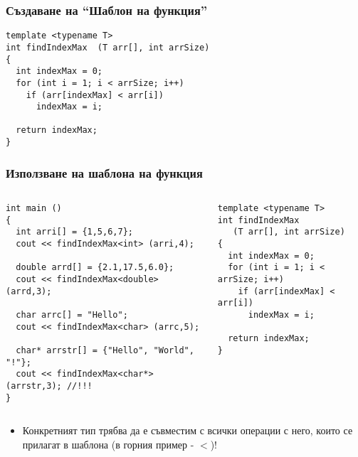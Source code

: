 \documentclass{beamer}
\begin{document}
\begin{frame}[fragile]
\frametitle{Създаване на ``Шаблон на функция''}


\begin{flushleft}
\begin{lstlisting}
template <typename T>
int findIndexMax  (T arr[], int arrSize)
{
  int indexMax = 0;
  for (int i = 1; i < arrSize; i++)
    if (arr[indexMax] < arr[i])
      indexMax = i;

  return indexMax;
}

\end{lstlisting}  
\end{flushleft}

\end{frame}


\begin{frame}[fragile]
\frametitle{Използване на шаблона на функция}

\begin{columns}[t]
  \begin{column}{0.6\textwidth}

\begin{flushleft}
\begin{lstlisting}
int main ()
{
  int arri[] = {1,5,6,7};
  cout << findIndexMax<int> (arri,4);

  double arrd[] = {2.1,17.5,6.0};
  cout << findIndexMax<double> (arrd,3);

  char arrc[] = "Hello";
  cout << findIndexMax<char> (arrc,5);

  char* arrstr[] = {"Hello", "World", "!"};
  cout << findIndexMax<char*> (arrstr,3); //!!!
}
\end{lstlisting}  
\end{flushleft}

  \end{column}
  \begin{column}{0.4\textwidth}

\begin{flushleft}
\begin{lstlisting}
template <typename T>
int findIndexMax  
   (T arr[], int arrSize)
{
  int indexMax = 0;
  for (int i = 1; i < arrSize; i++)
    if (arr[indexMax] < arr[i])
      indexMax = i;

  return indexMax;
}

\end{lstlisting}  
\end{flushleft}
  \end{column}
\end{columns}

\begin{itemize}
  \item Конкретният тип трябва да е съвместим с всички операции с него, които се прилагат в шаблона (в горния пример - $<$)!
\end{itemize}

\end{frame}
\end{document}
